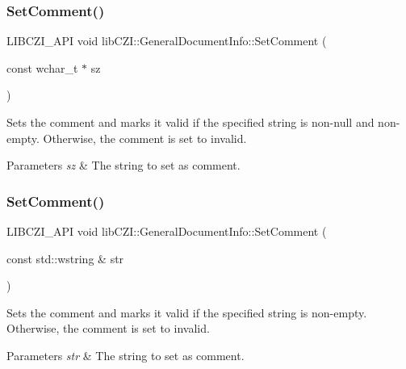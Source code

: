 \subsubsection{\texorpdfstring{Set\+Comment()}{SetComment()}\hspace{0.1cm}{\footnotesize\ttfamily [1/2]}}
{\footnotesize\ttfamily L\+I\+B\+C\+Z\+I\+\_\+\+A\+PI void lib\+C\+Z\+I\+::\+General\+Document\+Info\+::\+Set\+Comment (\begin{DoxyParamCaption}\item[{const wchar\+\_\+t $\ast$}]{sz }\end{DoxyParamCaption})\hspace{0.3cm}{\ttfamily [inline]}}

Sets the comment and marks it valid if the specified string is non-\/null and non-\/empty. Otherwise, the comment is set to invalid.


\begin{DoxyParams}{Parameters}
{\em sz} & The string to set as comment. \\
\hline
\end{DoxyParams}
\mbox{\label{structlib_c_z_i_1_1_general_document_info_ae07b44217a9b785e6f4a50be963cf1b3}} 
\subsubsection{\texorpdfstring{Set\+Comment()}{SetComment()}\hspace{0.1cm}{\footnotesize\ttfamily [2/2]}}
{\footnotesize\ttfamily L\+I\+B\+C\+Z\+I\+\_\+\+A\+PI void lib\+C\+Z\+I\+::\+General\+Document\+Info\+::\+Set\+Comment (\begin{DoxyParamCaption}\item[{const std\+::wstring \&}]{str }\end{DoxyParamCaption})\hspace{0.3cm}{\ttfamily [inline]}}

Sets the comment and marks it valid if the specified string is non-\/empty. Otherwise, the comment is set to invalid.


\begin{DoxyParams}{Parameters}
{\em str} & The string to set as comment. \\
\hline
\end{DoxyParams}
\mbox{\label{structlib_c_z_i_1_1_general_document_info_a6b51c358c9bc5613ae4b7d5177c643fc}} 

